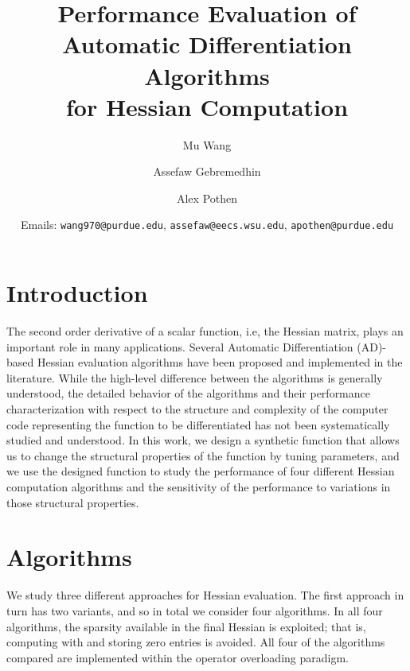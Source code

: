 \documentclass[11pt, a4paper, english]{article}
\begin{document}
\title{Performance Evaluation of Automatic Differentiation Algorithms \\ for Hessian Computation}
\author[1]{Mu Wang}
\author[2]{Assefaw Gebremedhin}
\author[1]{Alex Pothen}
\vspace{-15mm}
\date{Emails:  \texttt{wang970@purdue.edu}, \texttt{assefaw@eecs.wsu.edu},
\texttt{apothen@purdue.edu}}
\maketitle

\section*{Introduction}
The second order derivative of a scalar function, i.e, the Hessian matrix, plays 
an important role in many applications. 
Several Automatic Differentiation (AD)-based Hessian evaluation algorithms have been proposed and implemented in the literature. While the high-level difference between the algorithms is generally understood, the detailed behavior of the algorithms and their performance characterization with respect to the structure and complexity of the computer code  representing the function to be differentiated has not been systematically studied and understood. In this work, we design a synthetic function that allows us to change the structural properties of the function by tuning parameters, and we use the designed function to study the performance of four different Hessian computation algorithms and the sensitivity of the performance to variations in those structural properties.

\section*{Algorithms}

We study three different approaches for Hessian evaluation. The first approach in turn has two variants, and so in total we consider four algorithms. In all four algorithms, 
the sparsity available in the final Hessian is exploited; that is, computing with and storing zero entries is avoided. All four of the algorithms compared are implemented within the operator overloading paradigm. 
\end{document}
